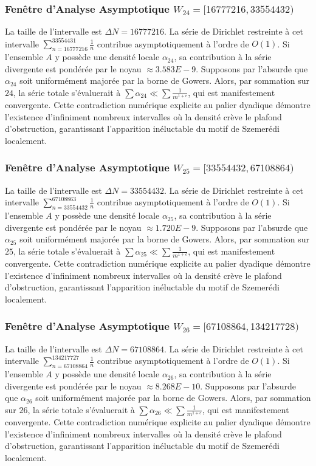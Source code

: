 \documentclass[11pt,a4paper]{article}
\begin{document}
\subsubsection{Fenêtre d'Analyse Asymptotique $W_{24} = [16777216, 33554432)$}
La taille de l'intervalle est $\Delta N = 16777216$. La série de Dirichlet restreinte à cet intervalle $\sum_{n=16777216}^{33554431} \frac{1}{n}$ contribue asymptotiquement à l'ordre de $O(1)$. Si l'ensemble $A$ y possède une densité locale $\alpha_{24}$, sa contribution à la série divergente est pondérée par le noyau $\approx 3.583E-9$. Supposons par l'absurde que $\alpha_{24}$ soit uniformément majorée par la borne de Gowers. Alors, par sommation sur $24$, la série totale s'évaluerait à $\sum \alpha_{24} \ll \sum \frac{1}{m^{1+\epsilon}}$, qui est manifestement convergente. Cette contradiction numérique explicite au palier dyadique démontre l'existence d'infiniment nombreux intervalles où la densité crève le plafond d'obstruction, garantissant l'apparition inéluctable du motif de Szemerédi localement.
\subsubsection{Fenêtre d'Analyse Asymptotique $W_{25} = [33554432, 67108864)$}
La taille de l'intervalle est $\Delta N = 33554432$. La série de Dirichlet restreinte à cet intervalle $\sum_{n=33554432}^{67108863} \frac{1}{n}$ contribue asymptotiquement à l'ordre de $O(1)$. Si l'ensemble $A$ y possède une densité locale $\alpha_{25}$, sa contribution à la série divergente est pondérée par le noyau $\approx 1.720E-9$. Supposons par l'absurde que $\alpha_{25}$ soit uniformément majorée par la borne de Gowers. Alors, par sommation sur $25$, la série totale s'évaluerait à $\sum \alpha_{25} \ll \sum \frac{1}{m^{1+\epsilon}}$, qui est manifestement convergente. Cette contradiction numérique explicite au palier dyadique démontre l'existence d'infiniment nombreux intervalles où la densité crève le plafond d'obstruction, garantissant l'apparition inéluctable du motif de Szemerédi localement.
\subsubsection{Fenêtre d'Analyse Asymptotique $W_{26} = [67108864, 134217728)$}
La taille de l'intervalle est $\Delta N = 67108864$. La série de Dirichlet restreinte à cet intervalle $\sum_{n=67108864}^{134217727} \frac{1}{n}$ contribue asymptotiquement à l'ordre de $O(1)$. Si l'ensemble $A$ y possède une densité locale $\alpha_{26}$, sa contribution à la série divergente est pondérée par le noyau $\approx 8.268E-10$. Supposons par l'absurde que $\alpha_{26}$ soit uniformément majorée par la borne de Gowers. Alors, par sommation sur $26$, la série totale s'évaluerait à $\sum \alpha_{26} \ll \sum \frac{1}{m^{1+\epsilon}}$, qui est manifestement convergente. Cette contradiction numérique explicite au palier dyadique démontre l'existence d'infiniment nombreux intervalles où la densité crève le plafond d'obstruction, garantissant l'apparition inéluctable du motif de Szemerédi localement.
\end{document}
